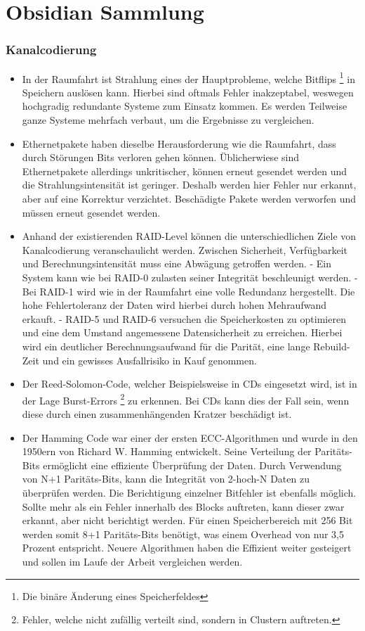 \section{Obsidian Sammlung}
\subsubsection{Kanalcodierung}
\begin{itemize}
	\item In der Raumfahrt ist Strahlung eines der Hauptprobleme, welche Bitflips
	\footnote{Die binäre Änderung eines Speicherfeldes}
	in Speichern auslösen kann.
	Hierbei sind oftmals Fehler inakzeptabel, weswegen hochgradig redundante Systeme zum Einsatz kommen.
	Es werden Teilweise ganze Systeme mehrfach verbaut, um die Ergebnisse zu vergleichen.
	\item Ethernetpakete haben dieselbe Herausforderung wie die Raumfahrt, dass durch Störungen Bits verloren gehen können.
	Üblicherwiese sind Ethernetpakete allerdings unkritischer, können erneut gesendet werden und die Strahlungsintensität ist geringer.
	Deshalb werden hier Fehler nur erkannt, aber auf eine Korrektur verzichtet.
	Beschädigte Pakete werden verworfen und müssen erneut gesendet werden.
	\item Anhand der existierenden RAID-Level können die unterschiedlichen Ziele von Kanalcodierung veranschaulicht werden.
	Zwischen Sicherheit, Verfügbarkeit und Berechnungsintensität muss eine Abwägung getroffen werden.
	- Ein System kann wie bei RAID-0 zulasten seiner Integrität beschleunigt werden.
	- Bei RAID-1 wird wie in der Raumfahrt eine volle Redundanz hergestellt. Die hohe Fehlertoleranz der Daten wird hierbei durch hohen Mehraufwand erkauft.
	- RAID-5 und RAID-6 versuchen die Speicherkosten zu optimieren und eine dem Umstand angemessene Datensicherheit zu erreichen. Hierbei wird ein deutlicher Berechnungsaufwand für die Parität, eine lange Rebuild-Zeit und ein gewisses Ausfallrisiko in Kauf genommen.
	\item Der Reed-Solomon-Code, welcher Beispielsweise in CDs eingesetzt wird, ist in der Lage Burst-Errors
	\footnote{Fehler, welche nicht zufällig verteilt sind, sondern in Clustern auftreten.}
	zu erkennen.
	Bei CDs kann dies der Fall sein, wenn diese durch einen zusammenhängenden Kratzer beschädigt ist.
	\item Der Hamming Code war einer der ersten ECC-Algorithmen und wurde in den 1950ern von Richard W. Hamming entwickelt.
	Seine Verteilung der Paritäts-Bits ermöglicht eine effiziente Überprüfung der Daten.
	Durch Verwendung von N+1 Paritäts-Bits, kann die Integrität von 2-hoch-N Daten zu überprüfen werden.
	Die Berichtigung einzelner Bitfehler ist ebenfalls möglich.
	Sollte mehr als ein Fehler innerhalb des Blocks auftreten, kann dieser zwar erkannt, aber nicht berichtigt werden.
	Für einen Speicherbereich mit 256 Bit werden somit 8+1 Paritäts-Bits benötigt, was einem Overhead von nur 3,5 Prozent entspricht.
	Neuere Algorithmen haben die Effizient weiter gesteigert und sollen im Laufe der Arbeit vergleichen werden.
\end{itemize}

